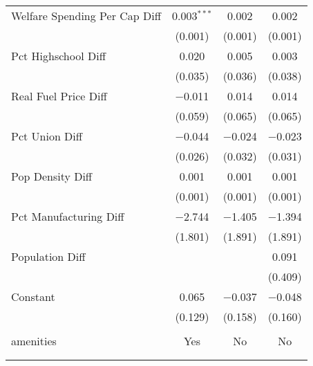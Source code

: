 \begin{table}[!htbp]
\begin{tabular}{@{\extracolsep{5pt}}lccc}
  Welfare Spending Per Cap Diff & 0.003$^{***}$ & 0.002 & 0.002 \\ 
  & (0.001) & (0.001) & (0.001) \\ 
  Pct Highschool Diff & 0.020 & 0.005 & 0.003 \\ 
  & (0.035) & (0.036) & (0.038) \\ 
  Real Fuel Price Diff & $-$0.011 & 0.014 & 0.014 \\ 
  & (0.059) & (0.065) & (0.065) \\ 
  Pct Union Diff & $-$0.044 & $-$0.024 & $-$0.023 \\ 
  & (0.026) & (0.032) & (0.031) \\ 
  Pop Density Diff & 0.001 & 0.001 & 0.001 \\ 
  & (0.001) & (0.001) & (0.001) \\ 
  Pct Manufacturing Diff & $-$2.744 & $-$1.405 & $-$1.394 \\ 
  & (1.801) & (1.891) & (1.891) \\ 
  Population Diff &  &  & 0.091 \\ 
  &  &  & (0.409) \\ 
  Constant & 0.065 & $-$0.037 & $-$0.048 \\ 
  & (0.129) & (0.158) & (0.160) \\ 
 \hline \\[-1.8ex] 
amenities & Yes & No & No \\ 
\hline \\[-1.8ex] 
\hline 
\hline \\[-1.8ex] 
\end{tabular} 
\end{table} 
